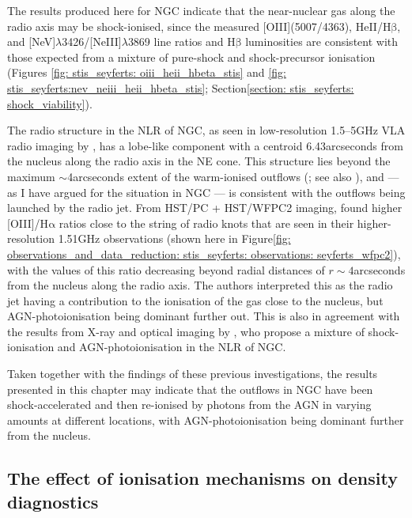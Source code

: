 The results produced here for NGC indicate that the near-nuclear gas along the radio axis may be shock-ionised, since the measured [OIII](5007/4363), HeII/H$\mathrm{\beta}$, and [NeV]$\lambda$3426/[NeIII]$\lambda$3869 line ratios and H$\mathrm{\beta}$ luminosities are consistent with those expected from a mixture of pure-shock and shock-precursor ionisation (Figures \ref{fig: stis_seyferts: oiii_heii_hbeta_stis} and \ref{fig: stis_seyferts:nev_neiii_heii_hbeta_stis}; Section\;\ref{section: stis_seyferts: shock_viability}).

The radio structure in the NLR of NGC, as seen in low-resolution 1.5--5\;GHz VLA radio imaging by \citet{Johnston1982}, has a lobe-like component with a centroid 6.43\;arcseconds from the nucleus along the radio axis in the NE cone. This structure lies beyond the maximum $\sim$4\;arcseconds extent of the warm-ionised outflows (\citealt{Meena2023}; see also \citealt{Das2005}), and --- as I have argued for the situation in NGC --- is consistent with the outflows being launched by the radio jet. From HST/PC + HST/WFPC2 imaging, \citet{Williams2017} found higher [OIII]/H$\mathrm{\alpha}$ ratios close to the string of radio knots that are seen in their higher-resolution 1.51\;GHz observations (shown here in Figure\;\ref{fig: observations_and_data_reduction: stis_seyferts: observations: seyferts_wfpc2}), with the values of this ratio decreasing beyond radial distances of $r\sim4$\;arcseconds from the nucleus along the radio axis. The authors interpreted this as the radio jet having a contribution to the ionisation of the gas close to the nucleus, but AGN-photoionisation being dominant further out. This is also in agreement with the results from X-ray and optical imaging by \citet{Wang2011b}, who propose a mixture of shock-ionisation and AGN-photoionisation in the NLR of NGC. 

Taken together with the findings of these previous investigations, the results presented in this chapter may indicate that the outflows in NGC have been shock-accelerated and then re-ionised by photons from the AGN in varying amounts at different locations, with AGN-photoionisation being dominant further from the nucleus.


\subsection{The effect of ionisation mechanisms on density diagnostics}
\label{section: stis_seyferts: disc-density-effects}


